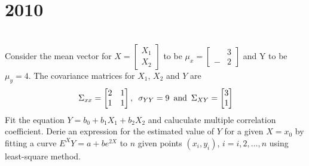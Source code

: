 \section*{2010}
\vspace{-.5cm}
\hrulefill \smallskip\\
 Consider the mean vector for $X = \left[ \begin{smallmatrix} X_1 \\ X_2 \end{smallmatrix}\right]$ to be $\mu_x = \left[ \begin{smallmatrix} &3 \\ -&2 \end{smallmatrix}\right]$ and Y to be $\mu_y = 4$. The covariance matrices for $X_1$, $X_2$ and $Y$ are
\[\Sigma_{xx} = \begin{bmatrix} 2 & 1 \\ 1 & 1\end{bmatrix}, \enskip \sigma_{YY} = 9 \enskip \text{and} \enskip \Sigma_{XY} = \begin{bmatrix} 3 \\ 1 \end{bmatrix} 
\] Fit the equation $Y =b_0 + b_1X_1 + b_2X_2$ and caluculate multiple correlation coefficient.
\myline
{} Derie an expression for the estimated value of $Y$ for a given $ X = x_0$ by fitting a curve $E^XY = a + be^{2X}$ to $n$ given points $(x_i,y_i)$, $i=i,2,\dotsc,n$ using least-square method.